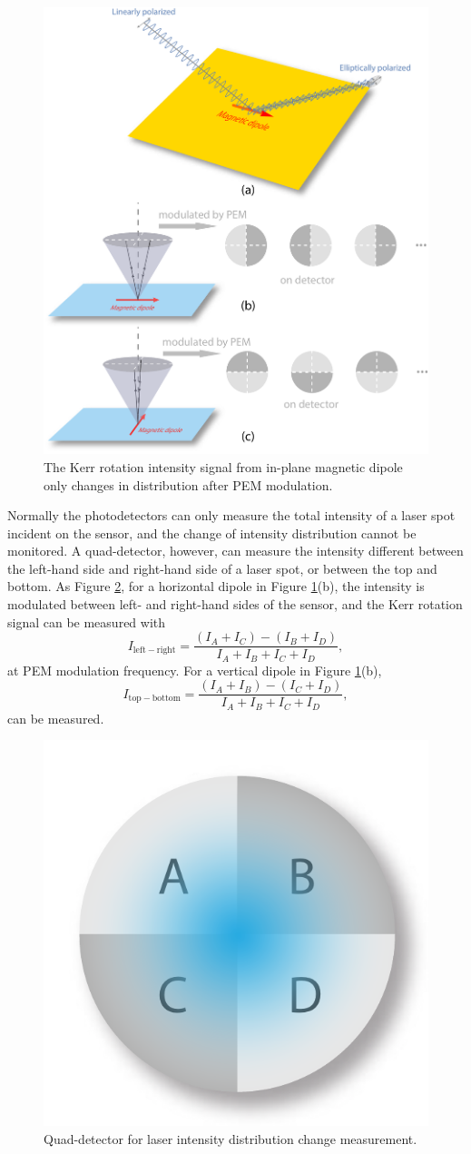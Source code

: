 \documentclass[pdflatex, sectionletters, 12pt]{pittetd}    %
\begin{document}
\begin{figure}[p]
	\centering
	\includegraphics[width=.9\textwidth]{Drawing/KerrInPlane.pdf}
	\caption{The Kerr rotation intensity signal from in-plane magnetic dipole only changes in distribution after PEM modulation.}
	\label{FIG:KerrInPlane}
\end{figure}

Normally the photodetectors can only measure the total intensity of a laser spot incident on the sensor, and the change of intensity distribution cannot be monitored. A quad-detector, however, can measure the intensity different between the left-hand side and right-hand side of a laser spot, or between the top and bottom. As Figure \ref{FIG:Quad}, for a horizontal dipole in Figure \ref{FIG:KerrInPlane}(b), the intensity is modulated between left- and right-hand sides of the sensor, and the Kerr rotation signal can be measured with
$$
I_\mathrm{left-right} = \frac{(I_A + I_C) - (I_B + I_D)}{I_A + I_B + I_C + I_D},
$$
at PEM modulation frequency. For a vertical dipole in Figure \ref{FIG:KerrInPlane}(b), 
$$
I_\mathrm{top-bottom} = \frac{(I_A + I_B) - (I_C + I_D)}{I_A + I_B + I_C + I_D},
$$
can be measured.
\\

\begin{figure}[h!]
	\centering
	\includegraphics[width=.25\textwidth]{Drawing/Quad.pdf}
	\caption{Quad-detector for laser intensity distribution change measurement.}
	\label{FIG:Quad}
\end{figure}
\end{document}
